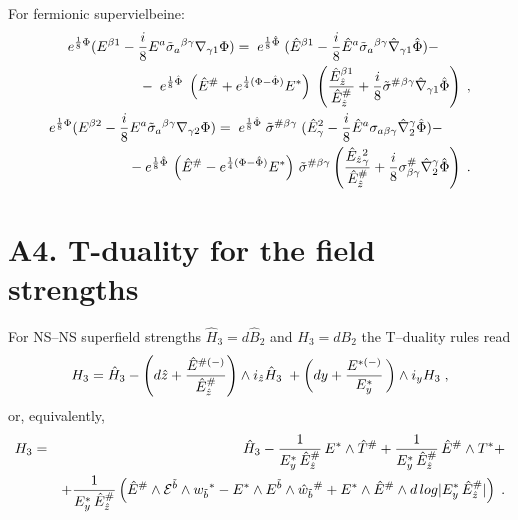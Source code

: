 \documentclass[a4paper,11pt]{article}
\begin{document}
For fermionic supervielbeine: 
\begin{eqnarray}\label{Td-EhE1r!}
e^{{1\over 8}{\Phi}} 
({E}^{ {\beta}1} - {i \over 8} 
{E}^{ {a}} 
\tilde{\sigma}_{ {a}}{}^{ {\beta} {\gamma}}
{\nabla}_{ {\gamma}1}{\Phi}) 
= \;  e^{{1\over 8}\hat{\Phi}}\; 
(\hat{E}^{ {\beta}1} - {i \over 8} 
\hat{E}^{ {a}}
\tilde{\sigma}_{ {a}}{}^{ {\beta} {\gamma}}
\hat{\nabla}_{ {\gamma}1}\hat{\Phi}) - 
\;  \qquad \nonumber \\  
{} \qquad - 
 \;  e^{{1\over 8}\hat{\Phi}}\; 
\left(\hat{E}^{ {\#}} + 
e^{{1\over 4}(\Phi -\hat{\Phi})}
{E}^{ {*}}\right) \; \left(
{
\hat{E}_{\hat{z}}^{ {\beta}1}\over \hat{E}_{\hat{z}}^{ {\#}}}
+  {i \over 8} 
\tilde{\sigma}^{ {\#}}{}^{ {\beta} {\gamma}}
\hat{\nabla}_{ {\gamma}1}\hat{\Phi}\right) \; , 
\\ 
\label{Td-EhE2r!} 
e^{{1\over 8}{\Phi}} 
({E}^{ {\beta}2} - {i \over 8} 
{E}^{ {a}} 
\tilde{\sigma}_{ {a}}{}^{ {\beta} {\gamma}}
{\nabla}_{ {\gamma}2}{\Phi}) 
= \; 
e^{{1\over 8}\hat{\Phi}}\;  
\tilde{\sigma}^{ {\#} {\beta} {\gamma}}
\; ( \hat{E}_{ {\gamma}}^2  - {i \over 8}  
\hat{E}^{ {a}}
{\sigma}_{{ {a}} {\beta} {\gamma}}
\hat{\nabla}^{ {\gamma}}_2\hat{\Phi}) - 
 \qquad \nonumber \\  
{} \qquad -   e^{{1\over 8}\hat{\Phi}}\,  
\left(\hat{E}^{ {\#}} - 
e^{{1\over 4}(\Phi -\hat{\Phi})}
{E}^{ {*}}\right) \, 
\tilde{\sigma}^{ {\#} {\beta} {\gamma}}
\left({\hat{E}_{\hat{z}}{}_{ {\gamma}}^2
\over \hat{E}_{\hat{z}}^{ {\#}}}  + {i \over 8}  
{\sigma}^{\#}_{ {\beta} {\gamma}}
\hat{\nabla}^{ {\gamma}}_2\hat{\Phi}\right) \; . 
\end{eqnarray}


\section*{A4. T-duality for the field strengths} 

For NS--NS superfield strengths $\hat{H}_3= d \hat{B}_2$ 
and $H_3=dB_2$ the T--duality rules read
\begin{equation}
\label{Td-HH1} 
H_3 = \hat{H}_3 
-  \left(d\hat{z} + 
{\hat{E}^{ {\#}(-)}\over \hat{E}_{\hat{z}}^{ {\#}}} 
\right)\wedge i_{\hat{z}} \hat{H}_3 \; + 
 \left(dy +  {{E}^{ {*}(-)}\over {E}_y^{ {*}}} \,
\right)\wedge i_y H_3  \; , 
\end{equation}
or, equivalently,   
\begin{eqnarray}
\label{Td-HH2} &
H_3 = & \hat{H}_3 
- {1\over {E}_y^{ {*}}\, \hat{E}_{\hat{z}}^{ {\#}}}
\, E^{ {*}} \wedge \hat{T}^{ {\# }}  
+ {1\over {E}_y^{ {*}}\, \hat{E}_{\hat{z}}^{ {\#}}}
\, \hat{E}^{ {\#}} \wedge {T}^{ {*}} + \\ 
\nonumber 
 & & + 
{1\over {E}_y^{ {*}}\, \hat{E}_{\hat{z}}^{ {\#}}}
\left( \hat{E}^{ {\#}} \wedge 
{\cal E}^{ {\tilde{b}}}\wedge 
{w}_{ {\tilde{b}}}{}^{ {*}}
-  {E}^{ {*}} \wedge 
{E}^{ {\tilde{b}}}\wedge \hat{w}_{ {\tilde{b}}}
{}^{ {\#}} +  {E}^{ {*}} \wedge 
\hat{E}^{ {\#}}\wedge d\, 
log|{E}_y^{ {*}}\, \hat{E}_{\hat{z}}^{ {\#}}|\right) 
\; .
\end{eqnarray}
\end{document}
